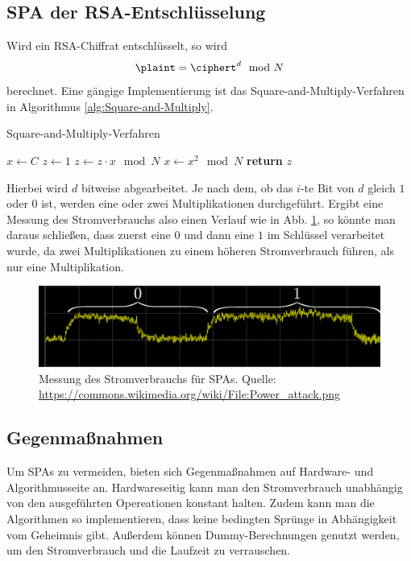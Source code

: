 \subsection{SPA der RSA-Entschlüsselung}
Wird ein RSA-Chiffrat entschlüsselt, so wird \[\plaint
  =\ciphert^d \mod N\] berechnet. Eine gängige Implementierung ist das
Square-and-Multiply-Verfahren in Algorithmus \ref{alg:Square-and-Multiply}. 
\begin{algorithm}[!h]
\caption{Square-and-Multiply-Verfahren}
\label{alg:Square-and-Multiply}
\begin{algorithmic}

  \State $x \gets C$
  \State $z \gets 1$
      \State $z \gets z \cdot x \mod N$
    \EndIf
    \State $x \gets x^2 \mod N$
  \EndFor
  \State \textbf{return} $z$
\EndProcedure
\end{algorithmic}
\end{algorithm}

Hierbei wird $d$ bitweise abgearbeitet. Je nach dem, ob das $i$-te Bit
von $d$ gleich $1$ oder $0$ ist, werden eine oder zwei Multiplikationen
durchgeführt. Ergibt eine Messung des Stromverbrauchs also einen Verlauf
wie in Abb. \ref{abb:power-attack}, so könnte man daraus schließen,
dass zuerst eine $0$ und dann eine $1$ im Schlüssel verarbeitet wurde,
da zwei Multiplikationen zu einem höheren Stromverbrauch führen, als nur
eine Multiplikation.

\begin{figure}[h]
  \centering
  \includegraphics[width=\textwidth]{images/Power_attack}
  \caption{Messung des Stromverbrauchs für SPAs. Quelle: \url{https://commons.wikimedia.org/wiki/File:Power_attack.png}}
  \label{abb:power-attack}
\end{figure}

\subsection{Gegenmaßnahmen}
Um SPAs zu vermeiden, bieten sich Gegenmaßnahmen auf Hardware- und
Algorithmusseite an. Hardwareseitig kann man den Stromverbrauch
unabhängig von den ausgeführten Opereationen konstant halten. Zudem kann
man die Algorithmen so implementieren, dass keine bedingten Sprünge
in Abhängigkeit vom Geheimnis gibt. Außerdem können Dummy-Berechnungen
genutzt werden, um den Stromverbrauch und die Laufzeit  zu verrauschen.

